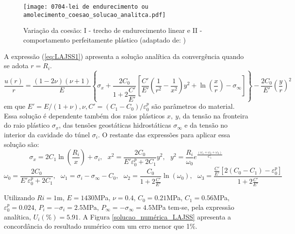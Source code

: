 \begin{figure}[H]
	\begin{center}
		\texttt{[image: 0704-lei de endurecimento ou amolecimento\_coesao\_solucao\_analitca.pdf]}
	\end{center}
	\caption{\label{coesao_solucao_analitca_LAJSS}Variação da coesão: I - trecho de endurecimento linear e II - comportamento perfeitamente plástico (adaptado de: )}
\end{figure}
A expressão (\ref{eq:LAJSS1}) apresenta a solução analítica da convergência quando se adota $r=R_i$.
\begin{equation}
	\label{eq:LAJSS1}
	\dfrac{u(r)}{r} = \dfrac{(1-2\nu)(\nu+1)}{E}\left\{\sigma_x+\dfrac{2C_0}{1+2\dfrac{C'}{E'}}\left[\dfrac{C'}{E'}\left(\dfrac{1}{r^2}-\dfrac{1}{x^2}\right) y^2+\ln{\left(\dfrac{x}{r}\right)-\sigma_\infty} \right]  \right\}-\dfrac{2C_0}{E'}\left(\dfrac{y}{r}\right)^2
\end{equation}
em que $E'=E/(1+\nu), \nu, C' = (C_1-C_0)/\varepsilon_0^p$ são parâmetros do material. Essa solução é dependente também dos raios plásticos $x,~y$, da tensão na fronteira do raio plástico $\sigma_x$, das tensões geostáticas hidrostáticas $\sigma_\infty$ e da tensão no interior da cavidade do túnel $\sigma_i$. O restante das expressões para aplicar essa solução são:
\begin{equation} \label{eq:LAJSS2}
	{{\sigma }_{x}}=2{{C}_{1}}\ln \left( \frac{{{R}_{i}}}{x} \right)+{{\sigma }_{i}},~~~ 	{{x}^{2}}=\frac{2{{C}_{0}}}{E'\varepsilon _{0}^{p}+2{{C}_{1}}}{{y}^{2}}, ~~~ 	{{y}^{2}}=\frac{{{R}_{i}}}{{{\omega }_{0}}}{{e}^{\frac{({{\omega }_{1}}+{{\omega }_{2}}+{{\omega }_{3}})}{{{C}_{1}}}}} 
\end{equation}
\begin{equation} \label{eq:LAJSS3}
	{{\omega }_{0}}=\frac{2{{C}_{0}}}{E'\varepsilon _{0}^{p}+2{{C}_{1}}}, ~~~ 	{{\omega }_{1}}={{\sigma }_{i}}-{{\sigma }_{\infty }}-{{C}_{0}} , ~~~ {{\omega }_{2}}=\frac{{{C}_{0}}}{1+2\frac{C'}{E'}}\ln ({{\omega }_{0}}), ~~~ 	{{\omega }_{3}}=\frac{\frac{C'}{E'}\left[ 2({{C}_{0}}-{{C}_{1}})-\varepsilon _{0}^{p} \right]}{1+2\frac{C'}{E'}}
\end{equation}

Utilizando $Ri=1$m, $E=1430$MPa, $\nu = 0.4$, $C_0=0.21$MPa, $C_1=0.56$MPa, $\varepsilon _{0}^{p}=0.024$, $P_i = -\sigma_i = 2.5$MPa, $ P_\infty = -\sigma_\infty = 4.5$MPa tem-se, pela expressão analítica, $U_i(\%) = 5.91$. A Figura \autoref{solucao_numérica_LAJSS} apresenta a concordância do resultado numérico com um erro menor que 1\%.

